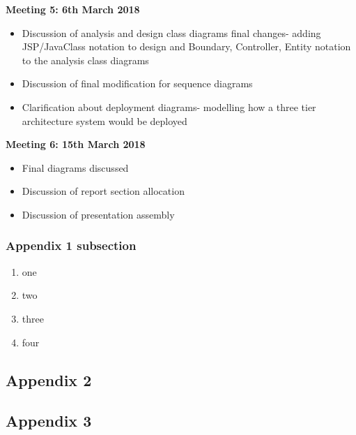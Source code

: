 \documentclass[fontsize=11pt]{extarticle}
\numberwithin{figure}{section} %
\numberwithin{table}{section}%
\begin{document}
\textbf{Meeting 5: 6th March 2018}

\begin{itemize}
	\item Discussion of analysis and design class diagrams final changes- adding JSP/JavaClass notation to design and Boundary, Controller, Entity notation to the analysis class diagrams
	\item Discussion of final modification for sequence diagrams
	\item Clarification about deployment diagrams- modelling how a three tier architecture system would be deployed

\end{itemize}

\textbf{Meeting 6: 15th March 2018}

\begin{itemize}
	\item Final diagrams discussed 
	\item Discussion of report section allocation
	\item Discussion of presentation assembly

\end{itemize}




\subsubsection{Appendix 1 subsection}

\begin{enumerate}

  \item one
  \item two
  \item three
  \item four

\end{enumerate}


\subsection{Appendix 2}

\subsection{Appendix 3}
\end{document}
